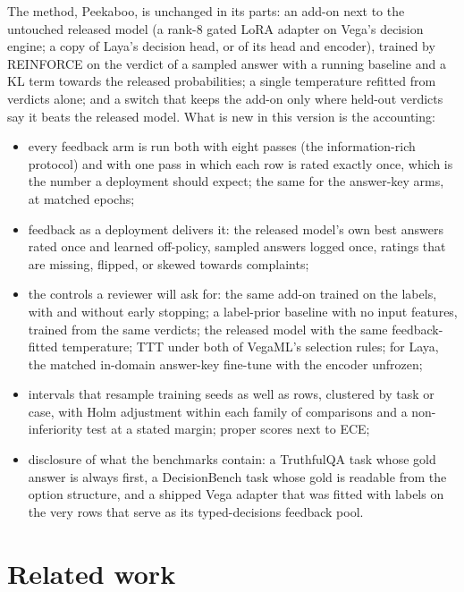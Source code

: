 \documentclass[11pt]{article}
\newcommand{\pk}{Peekaboo}
\begin{document}
The method, \pk{}, is unchanged in its parts: an add-on next to the untouched released model (a rank-8 gated LoRA adapter on Vega's decision engine; a copy of Laya's decision head, or of its head and encoder), trained by REINFORCE on the verdict of a sampled answer with a running baseline and a KL term towards the released probabilities; a single temperature refitted from verdicts alone; and a switch that keeps the add-on only where held-out verdicts say it beats the released model. What is new in this version is the accounting:
\begin{itemize}
\item every feedback arm is run both with eight passes (the information-rich protocol) and with one pass in which each row is rated exactly once, which is the number a deployment should expect; the same for the answer-key arms, at matched epochs;
\item feedback as a deployment delivers it: the released model's own best answers rated once and learned off-policy, sampled answers logged once, ratings that are missing, flipped, or skewed towards complaints;
\item the controls a reviewer will ask for: the same add-on trained on the labels, with and without early stopping; a label-prior baseline with no input features, trained from the same verdicts; the released model with the same feedback-fitted temperature; TTT under both of VegaML's selection rules; for Laya, the matched in-domain answer-key fine-tune with the encoder unfrozen;
\item intervals that resample training seeds as well as rows, clustered by task or case, with Holm adjustment within each family of comparisons and a non-inferiority test at a stated margin; proper scores next to ECE;
\item disclosure of what the benchmarks contain: a TruthfulQA task whose gold answer is always first, a DecisionBench task whose gold is readable from the option structure, and a shipped Vega adapter that was fitted with labels on the very rows that serve as its typed-decisions feedback pool.
\end{itemize}


\section{Related work}
\end{document}
